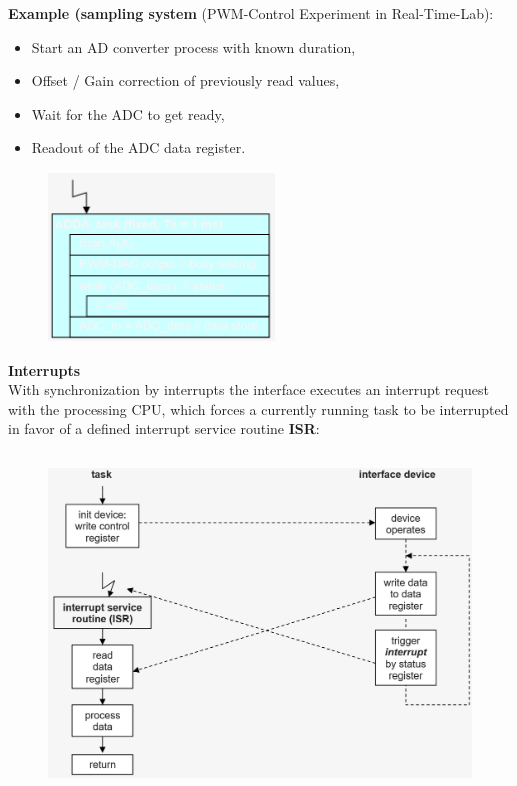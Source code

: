 \textbf{Example (sampling system }(PWM-Control Experiment in Real-Time-Lab): 

\begin{itemize}
	\item  Start an AD converter process with known duration, 
	\item  Offset / Gain correction of previously read values,
	\item  Wait for the ADC to get ready,
	\item  Readout of the ADC data register.
\end{itemize}

 	\begin{figure}[h]
    \centering
    \includegraphics[width=6cm, height=4.5cm]{Images/image125.png}
    \label{fig:Fig }
    \end{figure}

{\rot\bf Interrupts}\\

With synchronization by interrupts the interface executes an interrupt request with the processing CPU, which forces a currently running task to be interrupted in favor of a defined interrupt service routine \textbf{ISR}:

 	\begin{figure}[h]
    \centering
    \includegraphics[width=14cm, height=9cm]{Images/image126.png}
    \label{fig:Fig }
    \end{figure}

